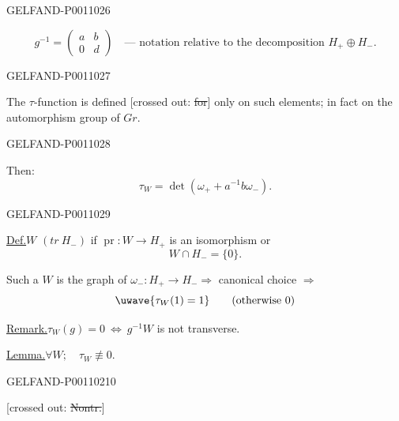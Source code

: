 \begin{GelfandAdjacentEvidence}{GELFAND-P001102}{6}


\[
g^{-1}=\begin{pmatrix}a&b\\0&d\end{pmatrix}
\quad\text{— notation relative to the decomposition } H_+\oplus H_-.
\]
\end{GelfandAdjacentEvidence}
\begin{GelfandAdjacentEvidence}{GELFAND-P001102}{7}


The $\tau$-function is defined [crossed out: \sout{for}] only on such elements; in fact on the automorphism group of $Gr$.
\end{GelfandAdjacentEvidence}
\begin{GelfandAdjacentEvidence}{GELFAND-P001102}{8}


Then:
\[
\tau_W=\det(\omega_++a^{-1}b\omega_-).
\]
\end{GelfandAdjacentEvidence}
\begin{GelfandAdjacentEvidence}{GELFAND-P001102}{9}


\underline{Def.}\quad $W$  $(tr\ H_-)$ if
$\operatorname{pr}:W\to H_+$ is an isomorphism or
\[
W\cap H_-=\{0\}.
\]

Such a $W$ is the graph of $\omega_-:H_+\to H_-$\qquad $\Rightarrow$ canonical choice $\Rightarrow$
\[
\text{\uwave{\(\tau_W(1)=1\)}}\qquad(\text{otherwise }0)
\]

\underline{Remark.}\quad $\tau_W(g)=0\ \Leftrightarrow\ g^{-1}W$ is not transverse.

\underline{Lemma.}\quad $\forall W;\quad\tau_W\not\equiv0$.
\end{GelfandAdjacentEvidence}
\begin{GelfandAdjacentEvidence}{GELFAND-P001102}{10}


[crossed out: \sout{Nontr.}]
\end{GelfandAdjacentEvidence}
